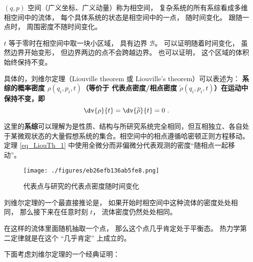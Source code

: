 
\begin{issues}
\issueDraft
\end{issues}

$(q, p)$ 空间（广义坐标、广义动量）称为相空间， 复杂系统的所有系综看成多维相空间中的流体， 每个具体系统的状态是相空间中的一点， 随时间变化。 跟随一点时， 周围密度不随时间变化。

$t$ 等于零时在相空间中取一块小区域， 具有边界 $\mathcal B$。 可以证明随着时间变化， 虽然边界开始变形， 但边界两边的点不会跨越边界。 也可以证明， 这个区域的体积始终保持不变。

具体的，刘维尔定理（Liouville theorem 或 Liouville's theorem）可以表述为：
\textbf{系综的概率密度 $\rho(q_i, p_i, t)$（等价于 代表点密度/相点密度 $\widetilde \rho(q_i, p_i, t)$）在运动中保持不变，即}
\begin{equation}\label{eq_LiouTh_1}
\dv{\rho}{t} = \dv{\widetilde{\rho}}{t} = 0 ~.
\end{equation}

这里的\textbf{系综}可以理解为是性质、结构与所研究系统完全相同，但互相独立、各自处于某微观状态的大量假想系统的集合。相空间中的相点遵循哈密顿正则方程移动。定理 \autoref{eq_LiouTh_1} 中使用全微分而非偏微分代表观测的密度“随相点一起移动”。

\begin{figure}[ht]
\centering
\texttt{[image: ./figures/eb26efb136ab5fe8.png]}
\caption{代表点与研究的代表点密度随时间变化} \label{fig_LiouTh_2}
\end{figure}




刘维尔定理的一个最直接推论是， 如果开始时相空间中这种流体的密度处处相同， 那么接下来在任意时刻 $t$， 流体密度仍然处处相同。

在这样的流体里面随机抽取一个点， 那么这个点几乎肯定处于平衡态。 热力学第二定律就是在这个 “几乎肯定” 上成立的。


















下面考虑刘维尔定理的一个经典证明：


